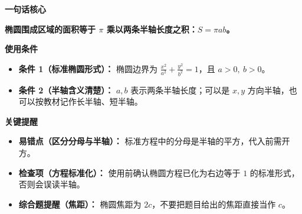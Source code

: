 \begin{summarybox}
\textbf{\textcolor{CSummary}{一句话核心}}

\textbf{椭圆围成区域的面积等于 $\pi$ 乘以两条半轴长度之积：$S=\pi ab$。}

\medskip
\textbf{\textcolor{CSummary}{使用条件}}
\begin{itemize}[leftmargin=*, itemsep=0.5em, topsep=0.4em]
    \item \textbf{条件 1（标准椭圆形式）：} 椭圆边界为 $\frac{x^2}{a^2}+\frac{y^2}{b^2}=1$，且 $a>0,\ b>0$。
    \item \textbf{条件 2（半轴含义清楚）：} $a,b$ 表示两条半轴长度；可以是 $x,y$ 方向半轴，也可以按教材记作长半轴、短半轴。
\end{itemize}

\medskip
\textbf{\textcolor{CSummary}{关键提醒}}
\begin{itemize}[leftmargin=*, itemsep=0.5em, topsep=0.4em]
    \item \textbf{易错点（区分分母与半轴）：} 标准方程中的分母是半轴的平方，代入前需开方。
    \item \textbf{检查项（方程标准化）：} 使用前确认椭圆方程已化为右边等于 $1$ 的标准形式，否则会误读半轴。
    \item \textbf{综合题提醒（焦距）：} 椭圆焦距为 $2c$，不要把题目给出的焦距直接当作 $c$。
\end{itemize}
\end{summarybox}